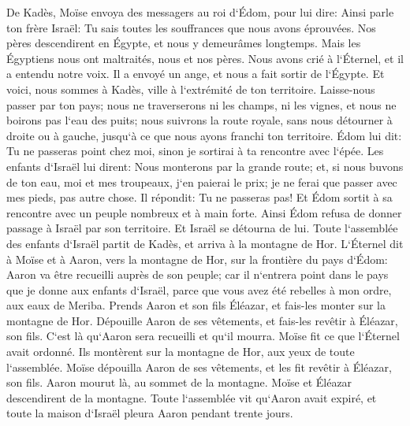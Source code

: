 \verse De Kadès, Moïse envoya des messagers au roi d`Édom, pour lui dire: Ainsi parle ton frère Israël: Tu sais toutes les souffrances que nous avons éprouvées. 
\verse Nos pères descendirent en Égypte, et nous y demeurâmes longtemps. Mais les Égyptiens nous ont maltraités, nous et nos pères. 
\verse Nous avons crié à l`Éternel, et il a entendu notre voix. Il a envoyé un ange, et nous a fait sortir de l`Égypte. Et voici, nous sommes à Kadès, ville à l`extrémité de ton territoire. 
\verse Laisse-nous passer par ton pays; nous ne traverserons ni les champs, ni les vignes, et nous ne boirons pas l`eau des puits; nous suivrons la route royale, sans nous détourner à droite ou à gauche, jusqu`à ce que nous ayons franchi ton territoire. 
\verse Édom lui dit: Tu ne passeras point chez moi, sinon je sortirai à ta rencontre avec l`épée. 
\verse Les enfants d`Israël lui dirent: Nous monterons par la grande route; et, si nous buvons de ton eau, moi et mes troupeaux, j`en paierai le prix; je ne ferai que passer avec mes pieds, pas autre chose. 
\verse Il répondit: Tu ne passeras pas! Et Édom sortit à sa rencontre avec un peuple nombreux et à main forte. 
\verse Ainsi Édom refusa de donner passage à Israël par son territoire. Et Israël se détourna de lui. 
\verse Toute l`assemblée des enfants d`Israël partit de Kadès, et arriva à la montagne de Hor. 
\verse L`Éternel dit à Moïse et à Aaron, vers la montagne de Hor, sur la frontière du pays d`Édom: 
\verse Aaron va être recueilli auprès de son peuple; car il n`entrera point dans le pays que je donne aux enfants d`Israël, parce que vous avez été rebelles à mon ordre, aux eaux de Meriba. 
\verse Prends Aaron et son fils Éléazar, et fais-les monter sur la montagne de Hor. 
\verse Dépouille Aaron de ses vêtements, et fais-les revêtir à Éléazar, son fils. C`est là qu`Aaron sera recueilli et qu`il mourra. 
\verse Moïse fit ce que l`Éternel avait ordonné. Ils montèrent sur la montagne de Hor, aux yeux de toute l`assemblée. 
\verse Moïse dépouilla Aaron de ses vêtements, et les fit revêtir à Éléazar, son fils. Aaron mourut là, au sommet de la montagne. Moïse et Éléazar descendirent de la montagne. 
\verse Toute l`assemblée vit qu`Aaron avait expiré, et toute la maison d`Israël pleura Aaron pendant trente jours. 

